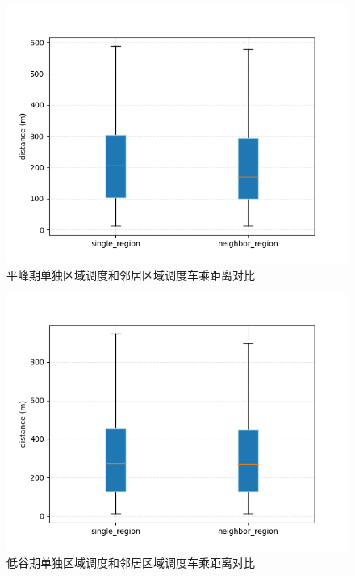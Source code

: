 \begin{figure}
  \centering
  \includegraphics[width=1.0\textwidth]{figures/平峰车乘匹配}
  \caption{平峰期单独区域调度和邻居区域调度车乘距离对比}\label{fig:pingRegionDistance}
\end{figure}

\begin{figure}
  \centering
  \includegraphics[width=1.0\textwidth]{figures/低谷车乘匹配}
  \caption{低谷期单独区域调度和邻居区域调度车乘距离对比}\label{fig:shaoRegionDistance}
\end{figure}


